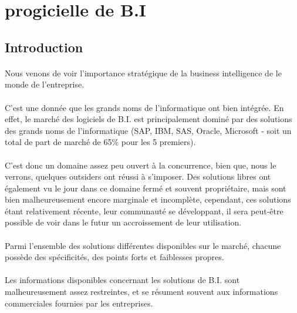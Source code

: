 \section{progicielle de B.I}

\subsection{Introduction}

\paragraph{} Nous venons de voir l’importance stratégique de la business intelligence de le monde de l’entreprise.

\paragraph{} C’est une donnée que les grands noms de l’informatique ont bien intégrée. En effet, le marché des logiciels de B.I. est principalement dominé par des solutions des grands noms de l’informatique (SAP, IBM, SAS, Oracle, Microsoft - soit un total de part de marché de 65\% pour les 5 premiers).

\paragraph{} C’est donc un domaine assez peu ouvert à la concurrence, bien que, nous le verrons, quelques outsiders ont réussi à s’imposer.
Des solutions libres ont également vu le jour dans ce domaine fermé et souvent propriétaire, mais sont bien malheureusement encore marginale et incomplète, cependant, ces solutions étant relativement récente, leur communauté se développant, il sera peut-être possible de voir dans le futur un accroissement de leur utilisation.

\paragraph{}Parmi l’ensemble des solutions différentes disponibles sur le marché, chacune possède des spécificités, des points forts et faiblesses propres.
\paragraph{} Les informations disponibles concernant les solutions de B.I. sont malheureusement assez restreintes, et se résument souvent aux informations commerciales fournies par les entreprises.

